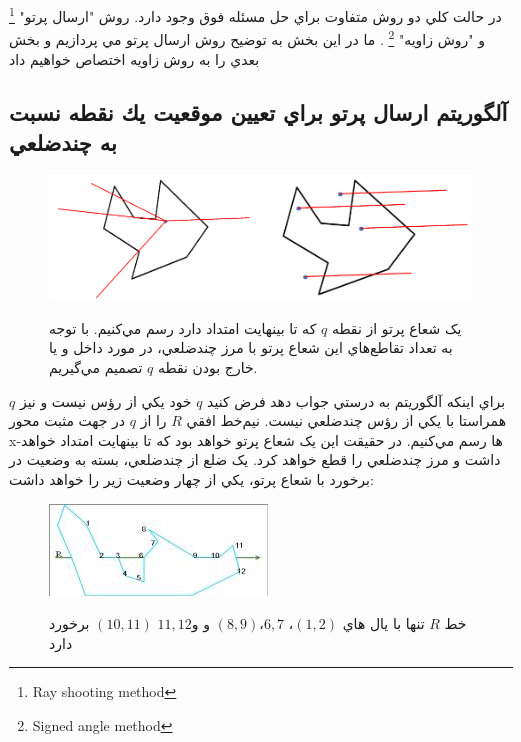 \documentclass{book}
\begin{document}
در حالت کلي دو روش متفاوت براي حل مسئله  فوق وجود دارد. روش "ارسال پرتو" \footnote{Ray shooting method}
و "روش زاويه" \footnote{Signed angle method}
. ما در اين بخش به توضيح روش ارسال پرتو مي پردازيم و بخش بعدي را به روش زاويه اختصاص خواهيم داد

\subsection{آلگوريتم ارسال پرتو براي تعيين موقعيت يك نقطه نسبت به چندضلعي}

\begin{figure}[h!]
    \begin{center}
        \includegraphics[width=\linewidth]{ray.png}
        \label{ray}
        \caption{يک شعاع پرتو از نقطه  $q$ که تا بينهايت امتداد دارد رسم مي‌کنيم. با توجه به تعداد تقاطع‌هاي اين شعاع پرتو با مرز چندضلعي، در مورد داخل و يا خارج بودن نقطه $q$ تصميم مي‌گيريم.}
    \end{center}
\end{figure}

براي اينکه آلگوريتم به درستي جواب دهد فرض کنيد $q$  خود يکي از رؤس نيست و نيز $q$ همراستا با يکي از رؤس چندضلعي نيست. نيم‌خط افقي $R$ را از $q$ در جهت مثبت محور x-ها رسم مي‌کنيم. در حقيقت اين يک شعاع پرتو خواهد بود که تا بينهايت امتداد خواهد داشت و مرز چندضلعي را قطع خواهد کرد. يک ضلع از چندضلعي، بسته به وضعيت در برخورد با شعاع پرتو، يکي از چهار وضعيت زير را خواهد داشت:

\begin{figure}[h!]
    \begin{center}
        \includegraphics{intersection.jpg}
        \label{intersection}
        \caption{خط $R$ تنها با يال هاي $(1,2)$، $6,7$،$ (8,9)$ و $11,12و$ $(10,11)$ برخورد دارد}
    \end{center}
\end{figure}
\end{document}
